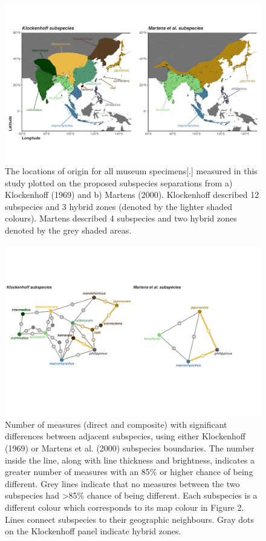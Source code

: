 \documentclass[10pt,a4paper]{article}
\begin{document}
\begin{figure}
\includegraphics[width=0.9\linewidth]{../Figures/combined Subspecies Plot} \caption{The locations of origin for all museum specimens[.] measured in this study plotted on the proposed subspecies separations from a) Klockenhoff (1969) and b) Martens (2000). Klockenhoff described 12 subspecies and 3 hybrid zones (denoted by the lighter shaded colours). Martens described 4 subspecies and two hybrid zones denoted by the grey shaded areas.}\label{fig:subspeciesPlots}
\end{figure}

\begin{figure}
\includegraphics[width=0.9\linewidth]{../Figures/combined Subspecies Difference Plot} \caption{Number of measures (direct and composite) with significant differences between adjacent subspecies, using either Klockenhoff (1969) or Martens et al. (2000) subspecies boundaries. The number inside the line, along with line thickness and brightness, indicates a greater number of measures with an 85\% or higher chance of being different. Grey lines indicate that no measures between the two subspecies had >85\% chance of being different. Each subspecies is a different colour which corresponds to its map colour in Figure 2. Lines connect subspecies to their geographic neighbours. Gray dots on the Klockenhoff panel indicate hybrid zones.}\label{fig:countOfDifferencesPlot}
\end{figure}
\end{document}
